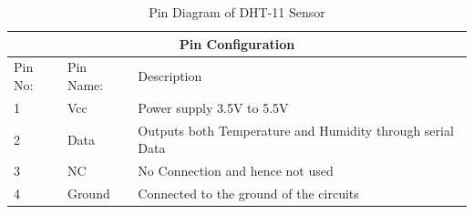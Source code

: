 \begin{table}[!ht]
\centering
\begin{tabular}{ |p{1cm}|p{2cm}|p{8cm}|  }
\hline
\multicolumn{3}{|c|}{Pin Configuration} \\
\hline
Pin No: & Pin Name: & Description \\
\hline
1 & Vcc  & Power supply 3.5V to 5.5V\\
2 & Data & Outputs both Temperature and Humidity through serial Data\\
3 & NC & No Connection and hence not used\\
4 & Ground & Connected to the ground of the circuits \\
\hline
\end{tabular}
\caption{\label{dht-11sensor}Pin Diagram of DHT-11 Sensor}
\end{table}
 








